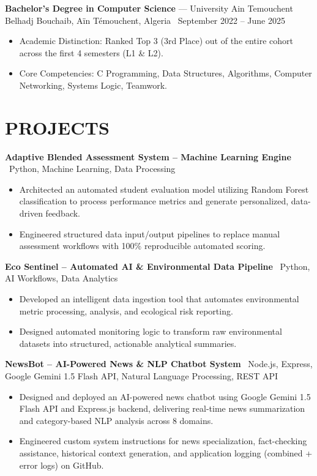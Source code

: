 \documentclass[10.5pt, letterpaper]{article}
\newcommand{\entry}[4]{%
  \noindent\textbf{#1} --- #3, #4 \textbar\ #2\par
  \vspace{2pt}
}
\newcommand{\projectentry}[2]{%
  \noindent\textbf{#1} \textbar\ #2\par
  \vspace{2pt}
}
\newcommand{\resumeItem}[1]{\item #1}
\begin{document}
\entry{Bachelor's Degree in Computer Science}{September 2022 -- June 2025}{University Ain Temouchent Belhadj Bouchaib}{Aïn Témouchent, Algeria}
\begin{itemize}
  \resumeItem{Academic Distinction: Ranked Top 3 (3rd Place) out of the entire cohort across the first 4 semesters (L1 \& L2).}
  \resumeItem{Core Competencies: C Programming, Data Structures, Algorithms, Computer Networking, Systems Logic, Teamwork.}
\end{itemize}

\section{PROJECTS}

\projectentry{Adaptive Blended Assessment System -- Machine Learning Engine}{Python, Machine Learning, Data Processing}
\begin{itemize}
  \resumeItem{Architected an automated student evaluation model utilizing Random Forest classification to process performance metrics and generate personalized, data-driven feedback.}
  \resumeItem{Engineered structured data input/output pipelines to replace manual assessment workflows with 100\% reproducible automated scoring.}
\end{itemize}

\projectentry{Eco Sentinel -- Automated AI \& Environmental Data Pipeline}{Python, AI Workflows, Data Analytics}
\begin{itemize}
  \resumeItem{Developed an intelligent data ingestion tool that automates environmental metric processing, analysis, and ecological risk reporting.}
  \resumeItem{Designed automated monitoring logic to transform raw environmental datasets into structured, actionable analytical summaries.}
\end{itemize}

\projectentry{NewsBot -- AI-Powered News \& NLP Chatbot System}{Node.js, Express, Google Gemini 1.5 Flash API, Natural Language Processing, REST API}
\begin{itemize}
  \resumeItem{Designed and deployed an AI-powered news chatbot using Google Gemini 1.5 Flash API and Express.js backend, delivering real-time news summarization and category-based NLP analysis across 8 domains.}
  \resumeItem{Engineered custom system instructions for news specialization, fact-checking assistance, historical context generation, and application logging (combined + error logs) on GitHub.}
\end{itemize}
\end{document}
